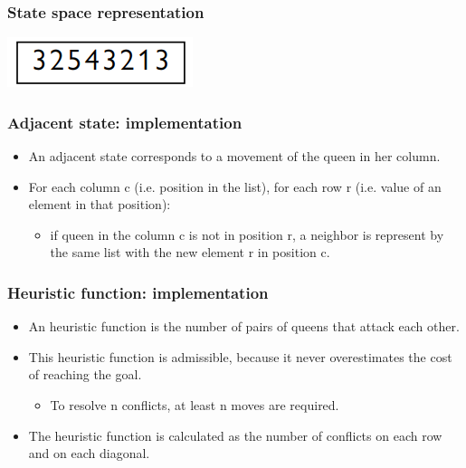\documentclass{beamer}
\begin{document}
    \begin{frame}
    \frametitle{State space representation}
        \includegraphics{Images/queens_position.png}
        \centering
    \end{frame}

    \begin{frame}
    \frametitle{Adjacent state: implementation}
        \begin{itemize}
            \item An adjacent state corresponds to a movement of the queen in her column.
            \pause
            \item For each column c (i.e. position in the list), for each row r (i.e. value of an element in that position): 
            \pause
            \begin{itemize}
                \item if queen in the column c is not in position r, a neighbor is represent by the same list with the new element r in position c.
            \end{itemize}
        \end{itemize}
    \end{frame}

    \begin{frame}
    \frametitle{Heuristic function: implementation}
    \begin{itemize}
        \item An heuristic function is the number of pairs of queens that attack each other.
        \pause 
        \item This heuristic function is admissible, because it never overestimates the cost of reaching the goal.
        \pause
        \begin{itemize}
            \item To resolve n conflicts, at least n moves are required.
        \end{itemize}
        \pause
        \item The heuristic function is calculated as the number of conflicts on each row and on each diagonal.
    \end{itemize}
    \end{frame}
\end{document}
